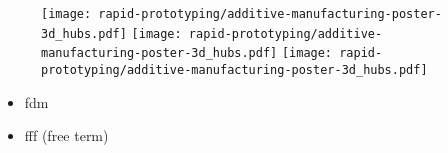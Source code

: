 \begin{frame}
    \begin{figure}
        \texttt{[image: rapid-prototyping/additive-manufacturing-poster-3d\_hubs.pdf]}
        \texttt{[image: rapid-prototyping/additive-manufacturing-poster-3d\_hubs.pdf]}
        \texttt{[image: rapid-prototyping/additive-manufacturing-poster-3d\_hubs.pdf]}
        \caption{}
    \end{figure}
    \begin{itemize}
        \item \gls{fdm} \texttrademark
        \item \gls{fff} (free term)
    \end{itemize}
\end{frame}